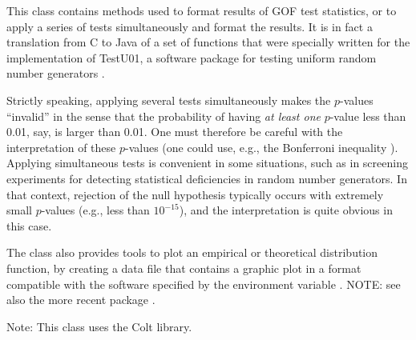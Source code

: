 
This class contains methods used to format results of GOF
test statistics, or to apply a series of tests
simultaneously and format the results.
It is in fact a translation from C to Java of a set of functions that
were specially written for the implementation of TestU01, a software
package for testing uniform random number generators \cite{iLEC01t}.

Strictly speaking, applying several tests simultaneously makes the
$p$-values ``invalid'' in the sense that the probability of having
{\em at least one\/} $p$-value less than 0.01, say, is larger than 0.01.
One must therefore be careful with the interpretation of these
$p$-values (one could use, e.g., the Bonferroni inequality \cite{sLAW00a}).
Applying simultaneous tests is convenient in some situations, such as in
screening experiments for detecting statistical deficiencies
in random number generators.  In that context, rejection of the null
hypothesis typically occurs with extremely small $p$-values (e.g., less
than $10^{-15}$), and the interpretation is quite obvious in this case.

The class also provides tools to plot an empirical or
theoretical distribution function, by creating a data file that
contains a graphic plot in a format compatible with the software
specified by the environment variable .
  NOTE: see also the more recent package
  .

Note: This class uses the Colt library.

